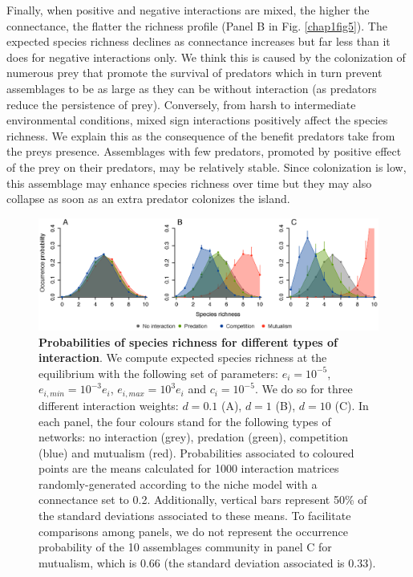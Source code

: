 Finally, when positive and negative interactions are mixed, the higher the connectance, the flatter the richness profile (Panel B in Fig. \ref{chap1fig5}). The expected species richness declines as connectance increases but far less than it does for negative interactions only. We think this is caused by the colonization of numerous prey that promote the survival of predators which in turn prevent assemblages to be as large as they can be without interaction (as predators reduce the persistence of prey). Conversely, from harsh to intermediate environmental conditions, mixed sign interactions positively affect the species richness. We explain this as the consequence of the benefit predators take from the preys presence. Assemblages with few predators, promoted by positive effect of the prey on their predators, may be relatively stable. Since colonization is low, this assemblage may enhance species richness over time but they may also collapse as soon as an extra predator colonizes the island.

\begin{figure}[h!]
\centering
\includegraphics [width=\textwidth]{./chapitre1/fig4.eps}
\caption[Probabilities of species richness for different types of interaction]{\textbf{Probabilities of species richness for different types of interaction}. We compute expected species richness at the equilibrium with the following set of parameters: $e_i=10^{-5}$, $e_{i,min}=10^{-3}e_i$, $e_{i,max}=10^{3}e_i$ and $c_i=10^{-5}$. We do so for three different interaction weights: $d=0.1$ (A), $d=1$ (B), $d=10$ (C). In each panel, the four colours stand for the following types of networks: no interaction (grey), predation (green), competition (blue) and mutualism (red). Probabilities associated to coloured points are the means calculated for 1000 interaction matrices randomly-generated according to the niche model \citep{Williams2000} with a connectance set to 0.2. Additionally, vertical bars represent 50\% of the standard deviations associated to these means. To facilitate comparisons among panels, we do not represent the occurrence probability of the 10 assemblages community in panel C for mutualism, which is 0.66 (the standard deviation associated is 0.33).}
\label{chap1fig4}
\end{figure}





